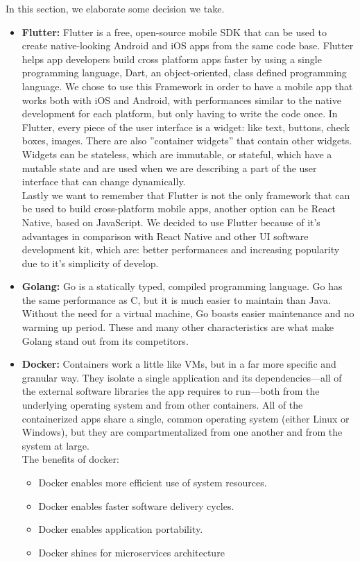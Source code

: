 In this section, we elaborate some decision we take.
\begin{itemize}
    \item \textbf{Flutter:} Flutter is a free, open-source mobile SDK that can be used to create native-looking Android and iOS apps from the same code base. Flutter helps app developers build cross platform apps faster by using a single programming language, Dart, an object-oriented, class defined programming language. We chose to use this Framework in order to have a mobile app that works both with iOS and Android, with performances similar to the native development for each platform, but only having to write the code once. In Flutter, every piece of the user interface is a widget: like text, buttons, check boxes, images. There are also ”container widgets” that contain other widgets. Widgets can be stateless, which are immutable, or stateful, which have a mutable state and are used when we are describing a part of the user interface that can change dynamically.\\
    Lastly we want to remember that Flutter is not the only framework that can be used to build cross-platform mobile apps, another option can be React Native, based on JavaScript. We decided to use Flutter because of it’s advantages in comparison with React Native and other UI software development kit, which are: better performances and increasing popularity due to it’s simplicity of develop.
    
    \item \textbf{Golang:} Go is a statically typed, compiled programming language. Go has the same performance as C, but it is much easier to maintain than Java. Without the need for a virtual machine, Go boasts easier maintenance and no warming up period. These and many other characteristics are what make Golang stand out from its competitors. 
    
    \item \textbf{Docker:} Containers work a little like VMs, but in a far more specific and granular way. They isolate a single application and its dependencies—all of the external software libraries the app requires to run—both from the underlying operating system and from other containers. All of the containerized apps share a single, common operating system (either Linux or Windows), but they are compartmentalized from one another and from the system at large.\\
    The benefits of docker:
    \begin{itemize}
        \item Docker enables more efficient use of system resources.
        \item Docker enables faster software delivery cycles.
        \item Docker enables application portability.
        \item Docker shines for microservices architecture
    \end{itemize}

\end{itemize}